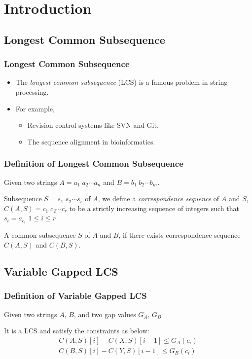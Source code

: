 \section{Introduction}

\subsection{Longest Common Subsequence}

\begin{frame}
    \frametitle{Longest Common Subsequence}
    \begin{itemize}
        \setlength\itemsep{1em}
        \item 
            The {\em longest common subsequence} (LCS) is a famous
            problem in string processing.
        \item 
            For example, 
            \begin{itemize}
                \setlength\itemsep{1em}
                \item 
                    Revision control systems like SVN and Git.
                \item 
                    The sequence alignment in bioinformatics.
            \end{itemize}
    \end{itemize}
\end{frame}

\begin{frame}
    \frametitle{Definition of Longest Common Subsequence}
    Given two strings $A = a_1 \; a_2 \cdots a_n$ and $B = b_1 \; b_2
    \cdots b_m$.
    \begin{definition}
        Subsequence $S = s_1 \; s_2 \cdots s_r$ of $A$, we define a
        \emph{correspondence sequence} of $A$ and $S$, $C(A, S) = c_1 \;
        c_2 \cdots c_r$ to be a strictly increasing sequence of integers
        such that $s_i = a_{c_i}$ $1 \le i \le r$
	\end{definition}
	\begin{definition}
        A common subsequence $S$ of $A$ and $B$, if there exists
        correspondence sequence $C(A, S)$ and $C(B, S)$.
	\end{definition}
\end{frame}



\subsection{Variable Gapped LCS}
\begin{frame}
    \frametitle{Definition of Variable Gapped LCS}
    Given two strings $A$, $B$, and two gap values $G_{A}$, $G_{B}$
    \begin{definition}
        It is a LCS and satisfy the constraints as below:
        \begin{align*}
            C(A, S)[i] - C(X, S)[i-1] \le G_{A}(c_i) \\
            C(B, S)[i] - C(Y, S)[i-1] \le G_{B}(c_i)
        \end{align*}
    \end{definition}
\end{frame}

